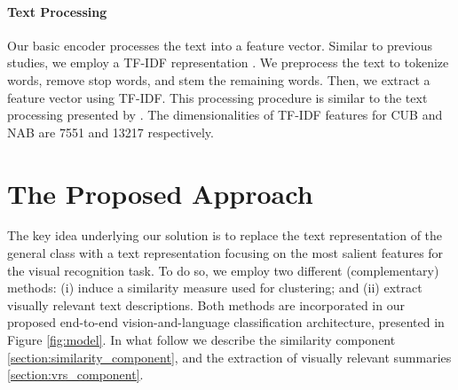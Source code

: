 \documentclass[11pt,a4paper]{article}
\newcommand\yuval[1]{\textcolor{darkpink}{\textbf{YUVAL:} #1 }}
\begin{document}


\paragraph{Text Processing}
\label{section:Text_Encoder}
Our basic encoder processes the text into a feature vector. Similar to previous studies, we employ a TF-IDF representation \citep{salton1988term}. %
We preprocess the text to tokenize words, remove stop words, and stem the remaining words. Then, we extract a feature vector using TF-IDF. This processing procedure is similar to the text processing presented by \citet{zhu2018generative}.
The dimensionalities of TF-IDF features for CUB and NAB are 7551 and 13217 respectively. 

\section{The Proposed Approach}
\label{sections:ZEST}
The key idea underlying our solution is to replace the text representation of the general class with a text representation focusing on the most salient features for the visual recognition task.
To do so, we employ two different (complementary) methods: (i) induce a similarity measure used for clustering; and (ii) extract visually relevant text descriptions. Both methods are incorporated in our proposed end-to-end vision-and-language classification architecture, presented in Figure \ref{fig:model}. In what follow we describe the similarity component \ref{section:similarity_component}, and the extraction of visually relevant summaries \ref{section:vrs_component}.
\end{document}
